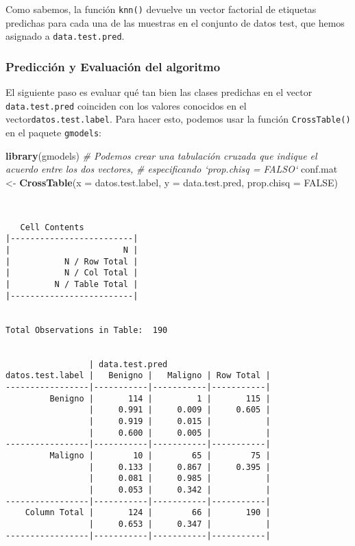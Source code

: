 \documentclass[
]{article}
\newenvironment{Shaded}{\begin{snugshade}}{\end{snugshade}}
\newcommand{\CommentTok}[1]{\textcolor[rgb]{0.56,0.35,0.01}{\textit{#1}}}
\newcommand{\DataTypeTok}[1]{\textcolor[rgb]{0.13,0.29,0.53}{#1}}
\newcommand{\KeywordTok}[1]{\textcolor[rgb]{0.13,0.29,0.53}{\textbf{#1}}}
\newcommand{\NormalTok}[1]{#1}
\newcommand{\OtherTok}[1]{\textcolor[rgb]{0.56,0.35,0.01}{#1}}
\newcommand{\StringTok}[1]{\textcolor[rgb]{0.31,0.60,0.02}{#1}}
\begin{document}
Como sabemos, la función \texttt{knn()} devuelve un vector factorial de
etiquetas predichas para cada una de las muestras en el conjunto de
datos test, que hemos asignado a \texttt{data.test.pred}.

\hypertarget{predicciuxf3n-y-evaluaciuxf3n-del-algoritmo}{%
\subsubsection{Predicción y Evaluación del
algoritmo}\label{predicciuxf3n-y-evaluaciuxf3n-del-algoritmo}}

El siguiente paso es evaluar qué tan bien las clases predichas en el
vector \texttt{data.test.pred} coinciden con los valores conocidos en el
vector\texttt{datos.test.label}. Para hacer esto, podemos usar la
función \texttt{CrossTable()} en el paquete \texttt{gmodels}:

\begin{Shaded}
\begin{Highlighting}[]
\KeywordTok{library}\NormalTok{(gmodels)}
\CommentTok{# Podemos crear una tabulación cruzada que indique el acuerdo entre los dos vectores, }
\CommentTok{# especificando `prop.chisq = FALSO`}
\NormalTok{conf.mat <-}\StringTok{ }\KeywordTok{CrossTable}\NormalTok{(}\DataTypeTok{x =}\NormalTok{ datos.test.label, }\DataTypeTok{y =}\NormalTok{ data.test.pred,}
           \DataTypeTok{prop.chisq =} \OtherTok{FALSE}\NormalTok{)}
\end{Highlighting}
\end{Shaded}

\begin{verbatim}

 
   Cell Contents
|-------------------------|
|                       N |
|           N / Row Total |
|           N / Col Total |
|         N / Table Total |
|-------------------------|

 
Total Observations in Table:  190 

 
                 | data.test.pred 
datos.test.label |   Benigno |   Maligno | Row Total | 
-----------------|-----------|-----------|-----------|
         Benigno |       114 |         1 |       115 | 
                 |     0.991 |     0.009 |     0.605 | 
                 |     0.919 |     0.015 |           | 
                 |     0.600 |     0.005 |           | 
-----------------|-----------|-----------|-----------|
         Maligno |        10 |        65 |        75 | 
                 |     0.133 |     0.867 |     0.395 | 
                 |     0.081 |     0.985 |           | 
                 |     0.053 |     0.342 |           | 
-----------------|-----------|-----------|-----------|
    Column Total |       124 |        66 |       190 | 
                 |     0.653 |     0.347 |           | 
-----------------|-----------|-----------|-----------|

 
\end{verbatim}
\end{document}
